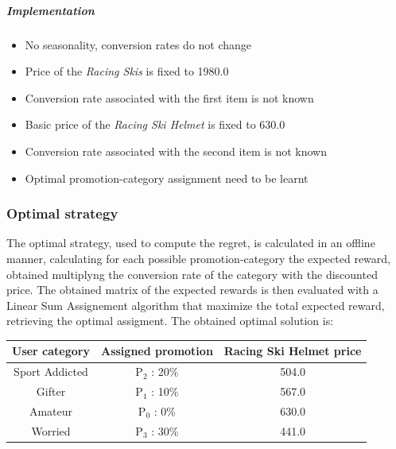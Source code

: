 \subparagraph{Implementation} 
\begin{itemize}
	\item No seasonality, conversion rates do not change
	\item Price of the \textit{Racing Skis} is fixed to 1980.0
	\item Conversion rate associated with the first item is not known
	\item Basic price of the \textit{Racing Ski Helmet} is fixed to 630.0
	\item Conversion rate associated with the second item is not known
	\item Optimal promotion-category assignment need to be learnt
\end{itemize}

\subsubsection*{Optimal strategy} The optimal strategy, used to compute the regret, is calculated in an offline manner, calculating for each possible promotion-category the expected reward, obtained multiplyng the conversion rate of the category with the discounted price. The obtained matrix of the expected rewards is then evaluated with a Linear Sum Assignement algorithm that maximize the total expected reward, retrieving the optimal assigment. The obtained optimal solution is:\\
\begin{center}
	\begin{tabular}{ |c|c|c|} 
	\hline
	User category & Assigned promotion & Racing Ski Helmet price \\
	\hline
	Sport Addicted & P$_2$ : 20\% & 504.0 \\
	\hline
	Gifter & P$_1$ : 10\% & 567.0 \\
	\hline
	Amateur & P$_0$ : 0\% & 630.0 \\
	\hline
	Worried & P$_3$ : 30\% & 441.0 \\
	\hline
	\end{tabular}
\end{center}


